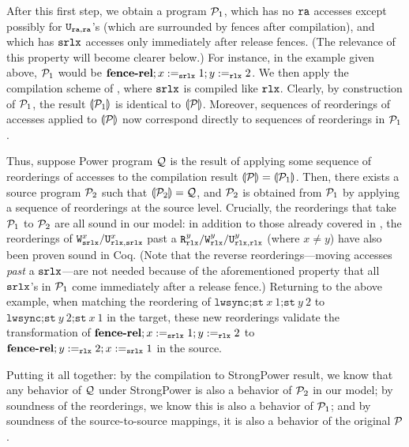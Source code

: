 After this first step, we obtain a program $\mathcal{P}_1$, which has no
$\texttt{ra}$ accesses except possibly for $\texttt{U}_{\texttt{ra},\texttt{ra}}$'s (which are
surrounded by fences after compilation), and which has ${\texttt{srlx}}$
accesses only immediately after release fences. (The relevance of this
property will become clearer
below.)  %
For instance, in the example given above, $\mathcal{P}_1$
would be $\textbf{fence-rel};x:=_{\texttt{srlx}} 1;y:=_{\texttt{rlx}} 2$.  We then apply the
compilation scheme of , where ${\texttt{srlx}}$ is compiled like
$\texttt{rlx}$.  Clearly, by construction of $\mathcal{P}_1$, the result
${\llparenthesis{\mathcal{P}_1}\rrparenthesis}$ is identical to ${\llparenthesis{\mathcal{P}}\rrparenthesis}$.  Moreover,
sequences of reorderings of accesses applied to ${\llparenthesis{\mathcal{P}}\rrparenthesis}$ now
correspond directly to sequences of reorderings in $\mathcal{P}_1$.

Thus, suppose Power program $\mathcal{Q}$ is the result of applying some
sequence of reorderings of accesses to the compilation result
${\llparenthesis{\mathcal{P}}\rrparenthesis} = {\llparenthesis{\mathcal{P}_1}\rrparenthesis}$.  Then, there exists a source
program $\mathcal{P}_2$ such that ${\llparenthesis{\mathcal{P}_2}\rrparenthesis}=\mathcal{Q}$, and $\mathcal{P}_2$
is obtained from $\mathcal{P}_1$ by applying a sequence of reorderings at
the source level.  Crucially, the reorderings that take $\mathcal{P}_1$ to
$\mathcal{P}_2$ are all sound in our model: in addition to those already
covered in , the reorderings of
$\texttt{W}^x_{\texttt{srlx}}/\texttt{U}^x_{\texttt{rlx},{\texttt{srlx}}}$ past a
$\texttt{R}_{\texttt{rlx}}^y/\texttt{W}_{\texttt{rlx}}^y/\texttt{U}_{\texttt{rlx},\texttt{rlx}}^y$ (where $x\neq y$) have
also been proven sound in Coq.  (Note that the reverse
reorderings---moving accesses \emph{past} a ${\texttt{srlx}}$---are not needed
because of the aforementioned property that all ${\texttt{srlx}}$'s in $\mathcal{P}_1$
come immediately after a release fence.)  Returning to the above
example, when matching the reordering of
$\texttt{lwsync;st}\ x\ 1\texttt{;st}\ y\ 2$ to
$\texttt{lwsync;st}\ y\ 2\texttt{;st}\ x\ 1$ in the target, these new
reorderings validate the transformation of
$\textbf{fence-rel};x:=_{\texttt{srlx}} 1;y:=_{\texttt{rlx}} 2$ to
$\textbf{fence-rel};y:=_{\texttt{rlx}} 2;x:=_{\texttt{srlx}} 1$ in the source.

Putting it all together: by the compilation to StrongPower result, we
know that any behavior of $\mathcal{Q}$ under StrongPower is also a
behavior of $\mathcal{P}_2$ in our model; by soundness of the reorderings,
we know this is also a behavior of $\mathcal{P}_1$; and by soundness of the
source-to-source mappings, it is also a behavior of the original
$\mathcal{P}$.

